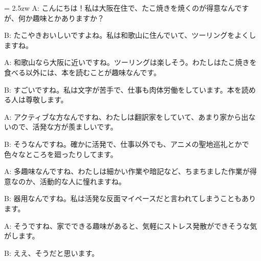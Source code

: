 \documentclass[11pt]{amsart}
\title{}
\author{}
\newenvironment{hangall}[1]{\hangindent = 2.5zw\everypar{\hangindent = 2.5zw}}{}
\begin{document}
\maketitle
\begin{hangall}{}%
A: こんにちは！私は大阪在住で、たこ焼きを焼くのが得意なんですが、何か趣味とかありますか？



B: たこやきおいしいですよね。私は和歌山に住んでいて、ツーリングをよくしますね。



A: 和歌山なら大阪に近いですね。ツーリングは楽しそう。わたしはたこ焼きを食べる以外には、本を読むことが趣味なんです。



B: すごいですね。私は文字が苦手で、仕事も肉体労働をしています。本を読める人は尊敬します。



A: アクティブな方なんですね、わたしは翻訳家をしていて、あまり家から出ないので、活発な方が羨ましいです。



B: そうなんですね。確かに活発で、仕事以外でも、アニメの聖地巡礼とかで色々なところを廻ったりしてます。



A: 多趣味なんですね、わたしは細かい作業や暗記など、ちまちました作業が得意なのか、活動的な人に憧れますね。



B: 器用なんですね。私は活発な反面マイペースだと言われてしまうこともあります。



A: そうですね、家でできる趣味があると、気軽にストレス発散ができそうな気がします。



B: ええ、そうだと思います。\end{hangall}
\end{document}
